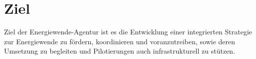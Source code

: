 \section{Ziel}

Ziel der Energiewende-Agentur ist es die Entwicklung einer integrierten Strategie zur Energiewende zu fördern, koordinieren und voranzutreiben, sowie deren Umsetzung zu begleiten und Pilotierungen auch infrastrukturell zu stützen.



